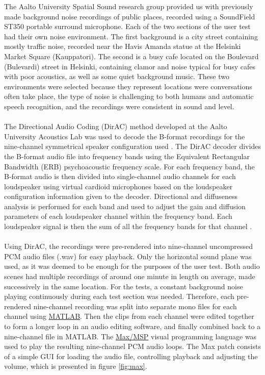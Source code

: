 \documentclass[english, 12pt, a4paper, pdftex, elec, utf8]{aaltothesis}
\begin{document}
The Aalto University Spatial Sound research group provided us with previously made background noise recordings of public places, recorded using a SoundField ST350 portable surround microphone. Each of the two sections of the user test had their own noise environment. The first background is a city street containing mostly traffic noise, recorded near the Havis Amanda statue at the Helsinki Market Square (Kauppatori). The second is a busy cafe located on the Boulevard (Bulevardi) street in Helsinki, containing clamor and noise typical for busy cafes with poor acoustics, as well as some quiet background music. These two environments were selected because they represent locations were conversations often take place, the type of noise is challenging to both humans and automatic speech recognition, and the recordings were consistent in sound and level. \\\\ 
The Directional Audio Coding (DirAC) method developed at the Aalto University Acoustics Lab was used to decode the B-format recordings for the nine-channel symmetrical speaker configuration used \cite{pulkki2015communication, pulkki2006directional}. The DirAC decoder divides the B-format audio file into frequency bands using the Equivalent Rectangular Bandwidth (ERB) psychoacoustic frequency scale. For each frequency band, the B-format audio is then divided into single-channel audio channels for each loudspeaker using virtual cardioid microphones based on the loudspeaker configuration information given to the decoder. Directional and diffuseness analysis is performed for each band and used to adjust the gain and diffusion parameters of each loudspeaker channel within the frequency band. Each loudspeaker signal is then the sum of all the frequency bands for that channel \cite{pulkki2006directional}. \\\\
Using DirAC, the recordings were pre-rendered into nine-channel uncompressed PCM audio files (.wav) for easy playback. Only the horizontal sound plane was used, as it was deemed to be enough for the purposes of the user test. Both audio scenes had multiple recordings of around one minute in length on average, made successively in the same location. For the tests, a constant background noise playing continuously during each test section was needed. Therefore, each pre-rendered nine-channel recording was split into separate mono files for each channel using \href{https://se.mathworks.com/products/matlab.html}{MATLAB}. Then the clips from each channel were edited together to form a longer loop in an audio editing software, and finally combined back to a nine-channel file in MATLAB. The \href{https://cycling74.com/products/max/}{Max/MSP} visual programming language was used to play the resulting nine-channel PCM audio loops. The Max patch consists of a simple GUI for loading the audio file, controlling playback and adjusting the volume, which is presented in figure \ref{fig:max}. \\
\end{document}
